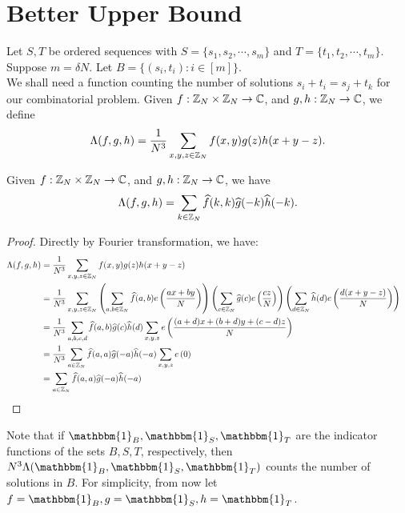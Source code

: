 \section{Better Upper Bound}
Let $ S, T $ be ordered sequences with $S = \{s_1, s_2, \cdots, s_m \}  $ and $ T = \{t_1, t_2, \cdots, t_m\} $. Suppose $ m = \delta N $.  Let $ B = \{(s_i,t_i): i \in [m] \} $.\\
We shall need a function counting the number of solutions $ s_i +t_i = s_j + t_k $ for our combinatorial problem. Given $ f : {\mathbb Z}_N \times {\mathbb Z}_N \rightarrow {\mathbb C} $, and $ g, h : {\mathbb Z}_N \rightarrow {\mathbb C} $, we define
$$ \Lambda(f,g,h) = \frac{1}{N^3} \sum\limits_{x,y,z \in {\mathbb Z}_N} f(x,y) g(z) h(x+y-z) .$$

\begin{lemma} \label{lem:to-Fourier}
	Given $ f : {\mathbb Z}_N \times {\mathbb Z}_N \rightarrow {\mathbb C} $, and $ g, h : {\mathbb Z}_N \rightarrow {\mathbb C} $, we have
	$$ \Lambda(f,g,h) = \sum\limits_{k \in {\mathbb Z}_N} \widehat{f}(k,k) \widehat{g}(-k) \widehat{h}(-k) .$$
\end{lemma}
\begin{proof}
	Directly by Fourier transformation, we have:
	\begin{align*}
		\Lambda(f,g,h) &= \frac{1}{N^3} \sum\limits_{x,y,z\in {\mathbb Z}_N} f(x,y)g(z)h(x+y-z)\\
		&=\frac{1}{N^3} \sum\limits_{x,y,z\in {\mathbb Z}_N}\left(\sum\limits_{a,b\in{\mathbb Z}_N} \widehat{f}(a,b) e\left(\frac{ax + by}{N}\right) \right)\left(\sum\limits_{c\in {\mathbb Z}_N}\widehat{g}(c) e\left(\frac{cz}{N}\right) \right)\left(\sum\limits_{d\in {\mathbb Z}_N}\widehat{h}(d)e\left(\frac{d(x+y-z)}{N}\right) \right)\\
		&=\frac{1}{N^3}\sum\limits_{a,b,c,d}\widehat{f}(a,b) \widehat{g}(c) \widehat{h}(d) \sum\limits_{x,y,z}e\left(\dfrac{(a+d)x + (b+d)y + (c-d)z}{N}\right)\\
		&= \frac{1}{N^3}\sum\limits_{a\in{\mathbb Z}_N} \widehat{f}(a,a) \widehat{g}(-a) \widehat{h}(-a)\sum\limits_{x,y,z}e\left(0\right)\\
		&= \sum\limits_{a\in{\mathbb Z}_N} \widehat{f}(a,a) \widehat{g}(-a) \widehat{h}(-a) & \qedhere
	\end{align*}
\end{proof}

\noindent Note that if $ \mathbbm{1}_{B}, \mathbbm{1}_S, \mathbbm{1}_T $ are the indicator functions of the sets $ B, S, T $, respectively, then  $ N^3 \Lambda(\mathbbm{1}_B, \mathbbm{1}_S, \mathbbm{1}_T) $ counts the number of solutions in $ B $. For simplicity, from now let $ f = \mathbbm{1}_B, g = \mathbbm{1}_S, h = \mathbbm{1}_T $. 

